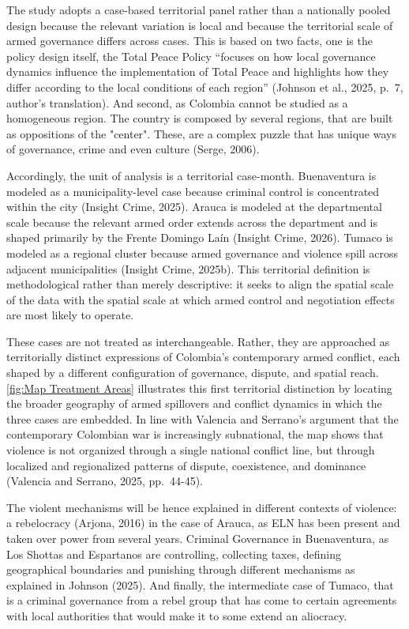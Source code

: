 \documentclass[11pt]{article}
\begin{document}
The study adopts a case-based territorial panel rather than a nationally pooled design because the relevant variation is local and because the territorial scale of armed governance differs across cases. This is based on two facts, one is the policy design itself, the Total Peace Policy ``focuses on how local governance dynamics influence the implementation of Total Peace and highlights how they differ according to the local conditions of each region'' (Johnson et al., 2025, p.~7, author's translation). And second, as Colombia cannot be studied as a homogeneous region. The country is composed by several regions, that are built as oppositions of the "center". These, are a complex puzzle that has unique ways of governance, crime and even culture (Serge, 2006).

Accordingly, the unit of analysis is a territorial case-month. Buenaventura is modeled as a municipality-level case because criminal control is concentrated within the city (Insight Crime, 2025). Arauca is modeled at the departmental scale because the relevant armed order extends across the department and is shaped primarily by the Frente Domingo Laín (Insight Crime, 2026). Tumaco is modeled as a regional cluster because armed governance and violence spill across adjacent municipalities (Insight Crime, 2025b). This territorial definition is methodological rather than merely descriptive: it seeks to align the spatial scale of the data with the spatial scale at which armed control and negotiation effects are most likely to operate.

These cases are not treated as interchangeable. Rather, they are approached as territorially distinct expressions of Colombia's contemporary armed conflict, each shaped by a different configuration of governance, dispute, and spatial reach.  \ref{fig:Map Treatment Areas}  illustrates this first territorial distinction by locating the broader geography of armed spillovers and conflict dynamics in which the three cases are embedded. In line with Valencia and Serrano's argument that the contemporary Colombian war is increasingly subnational, the map shows that violence is not organized through a single national conflict line, but through localized and regionalized patterns of dispute, coexistence, and dominance (Valencia and Serrano, 2025, pp.~44-45). 

The violent mechanisms will be hence explained in different contexts of violence: a rebelocracy (Arjona, 2016) in the case of Arauca, as ELN has been present and taken over power from several years. Criminal Governance in Buenaventura, as Los Shottas and Espartanos are controlling, collecting taxes, defining geographical boundaries and punishing through different mechanisms as explained in Johnson (2025). And finally, the intermediate case of Tumaco, that is a criminal governance from a rebel group that has come to certain agreements with local authorities that would make it to some extend an aliocracy. 
\end{document}
